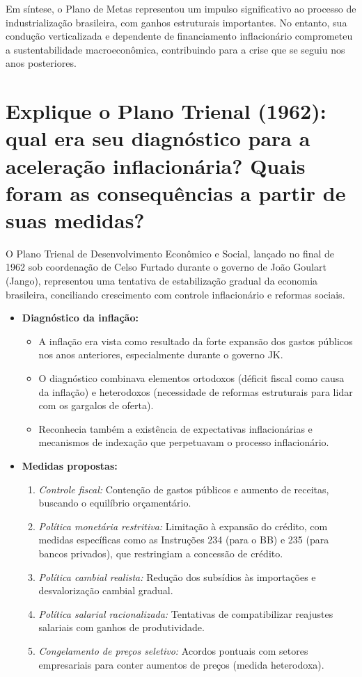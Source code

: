 \documentclass{sciposter}
\begin{document}
\begin{multicols}{3}
Em síntese, o Plano de Metas representou um impulso significativo ao processo de industrialização brasileira, com ganhos estruturais importantes. No entanto, sua condução verticalizada e dependente de financiamento inflacionário comprometeu a sustentabilidade macroeconômica, contribuindo para a crise que se seguiu nos anos posteriores.

\section{\textbf{Explique o Plano Trienal (1962): qual era seu diagnóstico para a aceleração inflacionária? Quais foram as consequências a partir de suas medidas?}}

O Plano Trienal de Desenvolvimento Econômico e Social, lançado no final de 1962 sob coordenação de Celso Furtado durante o governo de João Goulart (Jango), representou uma tentativa de estabilização gradual da economia brasileira, conciliando crescimento com controle inflacionário e reformas sociais.

\begin{itemize}
    \item \textbf{Diagnóstico da inflação:}
    \begin{itemize}
        \item A inflação era vista como resultado da forte expansão dos gastos públicos nos anos anteriores, especialmente durante o governo JK.
        \item O diagnóstico combinava elementos ortodoxos (déficit fiscal como causa da inflação) e heterodoxos (necessidade de reformas estruturais para lidar com os gargalos de oferta).
        \item Reconhecia também a existência de expectativas inflacionárias e mecanismos de indexação que perpetuavam o processo inflacionário.
    \end{itemize}

    \item \textbf{Medidas propostas:}
    \begin{enumerate}
        \item \textit{Controle fiscal:} Contenção de gastos públicos e aumento de receitas, buscando o equilíbrio orçamentário.
        \item \textit{Política monetária restritiva:} Limitação à expansão do crédito, com medidas específicas como as Instruções 234 (para o BB) e 235 (para bancos privados), que restringiam a concessão de crédito.
        \item \textit{Política cambial realista:} Redução dos subsídios às importações e desvalorização cambial gradual.
        \item \textit{Política salarial racionalizada:} Tentativas de compatibilizar reajustes salariais com ganhos de produtividade.
        \item \textit{Congelamento de preços seletivo:} Acordos pontuais com setores empresariais para conter aumentos de preços (medida heterodoxa).
    \end{enumerate}


\end{itemize}
\end{multicols}
\end{document}

